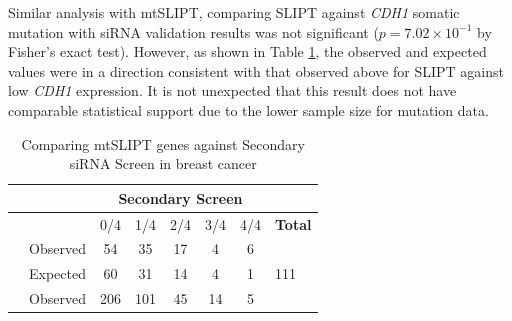 Similar analysis with mtSLIPT, comparing SLIPT against \textit{CDH1} somatic mutation with siRNA validation results was not significant ($p=7.02 \times 10^{-1}$ by Fisher's exact test). However,  as shown in Table \ref{tab:secondary_screen_mtSL}, the observed and expected values were in a direction consistent with that observed above for SLIPT against low \textit{CDH1} expression. It is not unexpected that this result does not have comparable statistical support due to the lower sample size for mutation data. 

\begin{table}[!ht]
\caption{Comparing mtSLIPT genes against Secondary siRNA Screen in breast cancer}
\label{tab:secondary_screen_mtSL}
\begin{center}
\begin{tabular}{>{\cellcolor{white}}rrcccccl}
                                                                              &                                                           & \multicolumn{5}{c}{\bfseries Secondary Screen}                                                                                     &                                           \\ \cline{3-7}
\rowcolor{black!10}
                                                                              & \multicolumn{1}{r|}{\cellcolor{white}}                    & 0/4                      & 1/4                      & 2/4                     & 3/4                     & \multicolumn{1}{c|}{4/4} & \cellcolor{white} \textbf{Total}          \\ \cline{2-8} 
\rowcolor{black!5}
\multicolumn{1}{r|}{\cellcolor{white}}                                        & \multicolumn{1}{r|}{Observed}                             & 54                       & 35                       & 17                      & 4                       & \multicolumn{1}{c|}{6}   &  \multicolumn{1}{l|}{}                     \\
\rowcolor{black!10}
\multicolumn{1}{r|}{\cellcolor{white} \multirow{-2}{*}{\bfseries mtSLIPT$+$}} & \multicolumn{1}{r|}{Expected}                             & 60                       & 31                       & 14                      & 4                       & \multicolumn{1}{c|}{1}   & \multicolumn{1}{l|}{\multirow{-2}{*}{111}}    \\ \cline{2-8} 
\rowcolor{black!5}
\multicolumn{1}{r|}{\cellcolor{white}}                                        & \multicolumn{1}{r|}{Observed}                             & 206                      & 101                      & 45                      & 14                      & \multicolumn{1}{c|}{5}   & \multicolumn{1}{l|}{}                     \\

\end{tabular}
\end{center}
\end{table}
